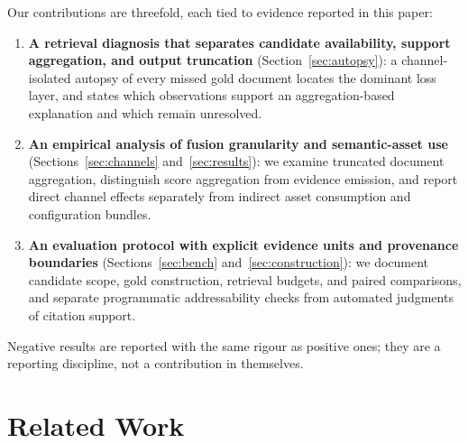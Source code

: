 \documentclass[sigconf,nonacm]{acmart}
\begin{document}
Our contributions are threefold, each tied to evidence reported in this
paper:
\begin{enumerate}
\item \textbf{A retrieval diagnosis that separates candidate
availability, support aggregation, and output truncation}
(Section~\ref{sec:autopsy}): a channel-isolated autopsy of every missed
gold document locates the dominant loss layer, and states which
observations support an aggregation-based explanation and which remain
unresolved.
\item \textbf{An empirical analysis of fusion granularity and
semantic-asset use} (Sections~\ref{sec:channels}
and~\ref{sec:results}): we examine truncated document aggregation,
distinguish score aggregation from evidence emission, and report direct
channel effects separately from indirect asset consumption and
configuration bundles.
\item \textbf{An evaluation protocol with explicit evidence units and
provenance boundaries} (Sections~\ref{sec:bench}
and~\ref{sec:construction}): we document candidate scope, gold
construction, retrieval budgets, and paired comparisons, and separate
programmatic addressability checks from automated judgments of
citation support.
\end{enumerate}
Negative results are reported with the same rigour as positive ones;
they are a reporting discipline, not a contribution in themselves.

\section{Related Work}
\label{sec:related}
\end{document}
